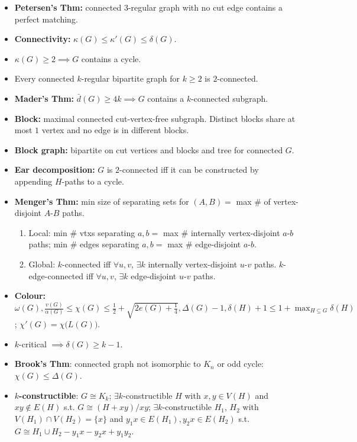 \documentclass[10pt]{article}
\begin{document}
\begin{multicols*}{3}
\begin{itemize}
            \item \textbf{Petersen's Thm:} connected $3$-regular graph with no cut edge contains a perfect matching.  
            \item \textbf{Connectivity:} $\kappa(G) \leq \kappa'(G) \leq \delta(G)$.
            \item $\kappa(G) \geq 2 \implies G$ contains a cycle. 
            \item Every connected $k$-regular bipartite graph for $k \geq 2$ is $2$-connected.
            \item \textbf{Mader's Thm:} $\bar{d}(G) \geq 4k \implies G$ contains a $k$-connected subgraph.
            \item \textbf{Block:} maximal connected cut-vertex-free subgraph. Distinct blocks share at most $1$ vertex and no edge is in different blocks.
            \item \textbf{Block graph:} bipartite on cut vertices and blocks and tree for connected $G$.
            \item \textbf{Ear decomposition:} $G$ is $2$-connected iff it can be constructed by appending $H$-paths to a cycle.
            \item \textbf{Menger's Thm:} min size of separating sets for $(A, B) =$ max \# of vertex-disjoint $A$-$B$ paths.
            \begin{enumerate}
                \item Local: min \# vtxs separating $a, b =$  max \# internally vertex-disjoint $a$-$b$ paths; min \# edges separating $a, b =$ max \# edge-disjoint $a$-$b$.
                \item Global: $k$-connected iff $\forall u, v$, $\exists k$ internally vertex-disjoint $u$-$v$ paths. $k$-edge-connected iff $\forall u, v$, $\exists k$ edge-disjoint $u$-$v$ paths.
            \end{enumerate}
            \item \textbf{Colour:} $\omega(G), \frac{v(G)}{\alpha(G)} \leq \chi(G) \leq \frac{1}{2} + \sqrt{2e(G) + \frac{1}{4}}, \Delta(G) - 1, \delta(H) + 1 \leq 1 + \max_{H \subseteq G}\delta(H)$; $\chi'(G) = \chi\bigl(L(G)\bigr)$.
            \item $k$-critical $\implies \delta(G) \geq k - 1$.
            \item \textbf{Brook's Thm}:  connected graph not isomorphic to $K_n$ or odd cycle: $\chi(G) \leq \Delta(G)$.
            \item \textbf{$k$-constructible}: $G \cong K_k$; $\exists k$-constructible $H$ with $x, y \in V(H)$ and $xy \notin E(H)$ s.t. $G \cong (H + xy)/xy$; $\exists k$-constructible $H_1$, $H_2$ with $V(H_1) \cap V(H_2) = \{x\}$ and $y_1x \in E(H_1), y_2x \in E(H_2)$ s.t. $G \cong H_1 \cup H_2 - y_1x - y_2x + y_1y_2$.

\end{itemize}
\end{multicols*}
\end{document}
